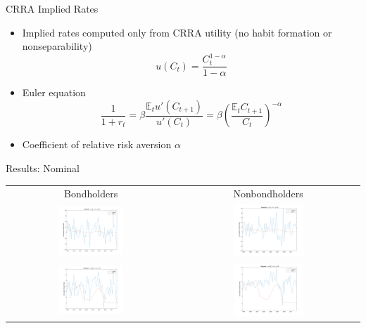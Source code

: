 \documentclass{beamer}
\def\E{\mathbb{E}}
\begin{document}
\begin{frame}{CRRA Implied Rates}
\begin{itemize}
\item Implied rates computed only from CRRA utility (no habit formation or nonseparability) $$u(C_t) = \frac{C_t^{1-\alpha}}{1-\alpha}$$
\item Euler equation $$\frac{1}{1+r_t} = \beta \frac{\E_t u'(C_{t+1})}{u'(C_t)} = \beta \left( \frac{\E_t C_{t+1}}{C_t} \right)^{-\alpha}$$
\item Coefficient of relative risk aversion $\alpha$
\end{itemize}
\end{frame}

\begin{frame}{Results: Nominal}
\begin{center}
\begin{tabular}{cc}
Bondholders & Nonbondholders \\
\includegraphics[width=0.4\textwidth]{figs/implied-vs-ffr/cex-bondholders/nominal_alpha2} & \includegraphics[width=0.4\textwidth]{figs/implied-vs-ffr/cex-nonbondholders/nominal_alpha2} \\
\includegraphics[width=0.4\textwidth]{figs/implied-vs-ffr/cex-bondholders/nominal_alpha_point2} & \includegraphics[width=0.4\textwidth]{figs/implied-vs-ffr/cex-nonbondholders/nominal_alpha_point2}
\end{tabular}
\end{center}
\end{frame}
\end{document}
